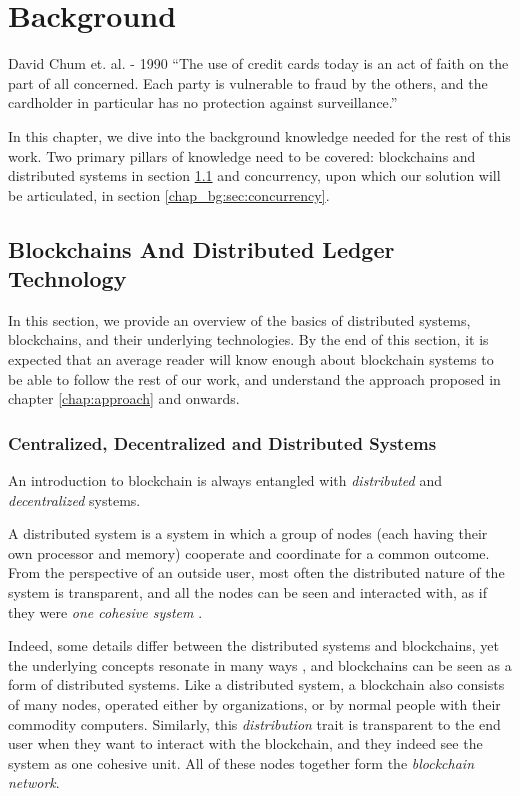 \chapter{Background} \label{chap:background}

\begin{chapquote}{David Chum et. al. - 1990}
``The use of credit cards today is an act of faith on the part of all concerned. Each party is
vulnerable to fraud by the others, and the cardholder in particular has no protection against
surveillance.''
\end{chapquote}


In this chapter, we dive into the background knowledge needed for the rest of this work. Two primary
pillars of knowledge need to be covered: blockchains and distributed systems in section
\ref{chap_bg:sec:blockchains} and concurrency, upon which our solution will be articulated, in
section \ref{chap_bg:sec:concurrency}.

\section{Blockchains And Distributed Ledger Technology} \label{chap_bg:sec:blockchains}

In this section, we provide an overview of the basics of distributed systems, blockchains, and their
underlying technologies. By the end of this section, it is expected that an average reader will know
enough about blockchain systems to be able to follow the rest of our work, and understand the
approach proposed in chapter \ref{chap:approach} and onwards.

\subsection{Centralized, Decentralized and Distributed Systems} \label{chap_bg_:subsec:network}

An introduction to blockchain is always entangled with \textit{distributed} and
\textit{decentralized} systems.

A distributed system is a system in which a group of nodes (each having their own processor and
memory) cooperate and coordinate for a common outcome. From the perspective of an outside user, most
often the distributed nature of the system is transparent, and all the nodes can be seen and
interacted with, as if they were \textit{one cohesive system}
\cite{bashirMASTERINGBLOCKCHAINDistributed2018}.

Indeed, some details differ between the distributed systems and blockchains, yet the underlying
concepts resonate in many ways \cite{herlihyBlockchainsDistributedComputing2019}, and blockchains
can be seen as a form of distributed systems. Like a distributed system, a blockchain also consists
of many nodes, operated either by organizations, or by normal people with their commodity computers.
Similarly, this \textit{distribution} trait is transparent to the end user when they want to
interact with the blockchain, and they indeed see the system as one cohesive unit. All of these
nodes together form the \textit{blockchain network}.

